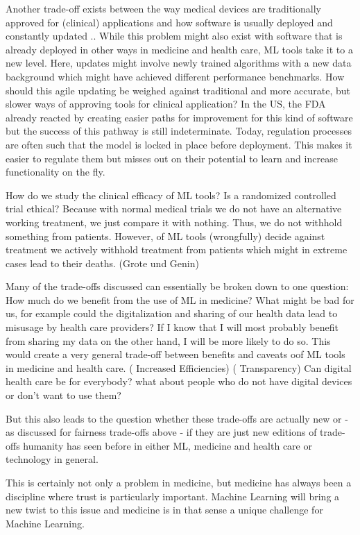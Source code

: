 Another trade-off exists between the way medical devices are traditionally approved for (clinical) applications and how software is usually deployed and constantly updated \cite{he2019practical}.. While this problem might also exist with software that is already deployed in other ways in medicine and health care, ML tools take it to a new level. Here, updates might involve newly trained algorithms with a new data background which might have achieved different performance benchmarks. How should this agile updating be weighed against traditional and more accurate, but slower ways of approving tools for clinical application? In the US, the FDA already reacted by creating easier paths for improvement for this kind of software but the success of this pathway is still indeterminate.
Today, regulation processes are often such that the model is locked in place before deployment. This makes it easier to regulate them but misses out on their potential to learn and increase functionality on the fly. 

How do we study the clinical efficacy of ML tools? Is a randomized controlled trial ethical? Because with normal medical trials we do not have an alternative working treatment, we just compare it with nothing. Thus, we do not withhold something from patients. However, of ML tools (wrongfully) decide against treatment we actively withhold treatment from patients which might in extreme cases lead to their deaths. (Grote und Genin)


 Many of the trade-offs discussed can essentially be broken down to one question: How much do we benefit from the use of ML in medicine? What might be bad for us, for example could the digitalization and sharing of our health data lead to misusage by health care providers? If I know that I will most probably benefit from sharing my data on the other hand, I will be more likely to do so. This would create a very general trade-off between benefits and caveats oof ML tools in medicine and health care. (\cite{topol2019high} Increased Efficiencies) (\cite{he2019practical} Transparency)
Can digital health care be for everybody? what about people who do not have digital devices or don't want to use them?

But this also leads to the question whether these trade-offs are actually new or - as discussed for fairness trade-offs above - if they are just new editions of trade-offs humanity has seen before in either ML, medicine and health care or technology in general.

This is certainly not only a problem in medicine, but medicine has always been a discipline where trust is particularly important. Machine Learning will bring a new twist to this issue and medicine is in that sense a unique challenge for Machine Learning.

